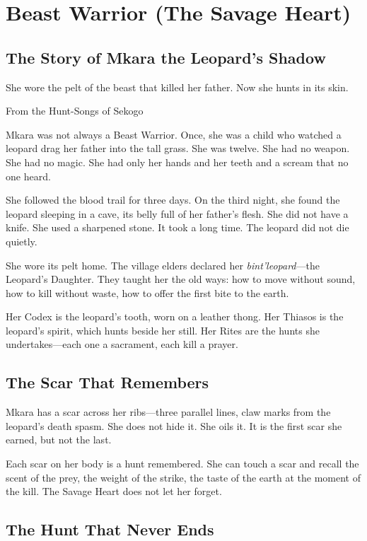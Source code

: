 \section{Beast Warrior (The Savage Heart)}

\subsection{The Story of Mkara the Leopard's Shadow}

\epigraph{She wore the pelt of the beast that killed her father. Now she hunts in its skin.}{From the Hunt-Songs of Sekogo}

Mkara was not always a Beast Warrior. Once, she was a child who watched a leopard drag her father into the tall grass. She was twelve. She had no weapon. She had no magic. She had only her hands and her teeth and a scream that no one heard.

She followed the blood trail for three days. On the third night, she found the leopard sleeping in a cave, its belly full of her father's flesh. She did not have a knife. She used a sharpened stone. It took a long time. The leopard did not die quietly.

She wore its pelt home. The village elders declared her \textit{bint'leopard}—the Leopard's Daughter. They taught her the old ways: how to move without sound, how to kill without waste, how to offer the first bite to the earth.

Her Codex is the leopard's tooth, worn on a leather thong. Her Thiasos is the leopard's spirit, which hunts beside her still. Her Rites are the hunts she undertakes—each one a sacrament, each kill a prayer.

\subsection{The Scar That Remembers}

Mkara has a scar across her ribs—three parallel lines, claw marks from the leopard's death spasm. She does not hide it. She oils it. It is the first scar she earned, but not the last.

Each scar on her body is a hunt remembered. She can touch a scar and recall the scent of the prey, the weight of the strike, the taste of the earth at the moment of the kill. The Savage Heart does not let her forget.

\subsection{The Hunt That Never Ends}

